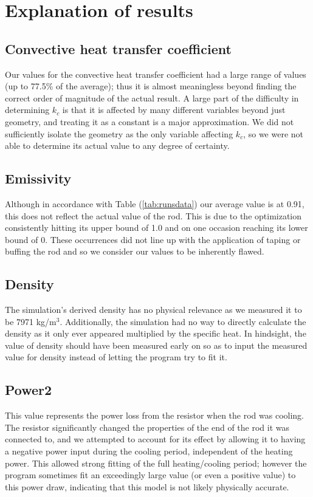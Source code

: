 \documentclass[letterpaper,titlepage,oneside]{report}
\begin{document}
\section{Explanation of results}

\subsection* {Convective heat transfer coefficient}
Our values for the convective heat transfer coefficient had a
large range of values (up to 77.5\% of the average); thus it is
almost meaningless beyond finding the correct order of
magnitude of the actual result.
A large part of the difficulty in determining $k_c$ is that it is
affected by many different variables beyond just geometry,
and treating it as a constant is a major approximation.
We did not sufficiently isolate the geometry as the only variable
affecting $k_c$, so we were not able to determine its actual value
to any degree of certainty.

\subsection* {Emissivity}
Although in accordance with Table (\ref{tab:runsdata}) our average
value is at 0.91, this does not reflect the
actual value of the rod. This is due to the optimization
consistently hitting its upper bound of 1.0 and on one
occasion reaching its lower bound of 0.
These occurrences did not line up with the application of taping
or buffing the rod and so we consider our values to be inherently
flawed.

\subsection* {Density}
The simulation's derived density has no physical relevance as we
measured it to be 7971 kg/m$^3$. Additionally, the simulation had
no way to directly calculate the density as it only ever
appeared multiplied by the specific heat.
In hindsight, the value of density should have been measured early on
so as to input the measured value for density instead of
letting the program try to fit it.

\subsection* {Power2}
This value represents the power loss from the resistor when the rod
was cooling. The resistor significantly changed the properties
of the end of the rod it was connected to, and we attempted to
account for its effect by allowing it to having a negative power
input during the cooling period, independent of the heating power.
This allowed strong fitting of the full heating/cooling period;
however the program sometimes fit an exceedingly large value
(or even a positive value) to this power draw,
indicating that this model is not likely physically accurate.
\end{document}
